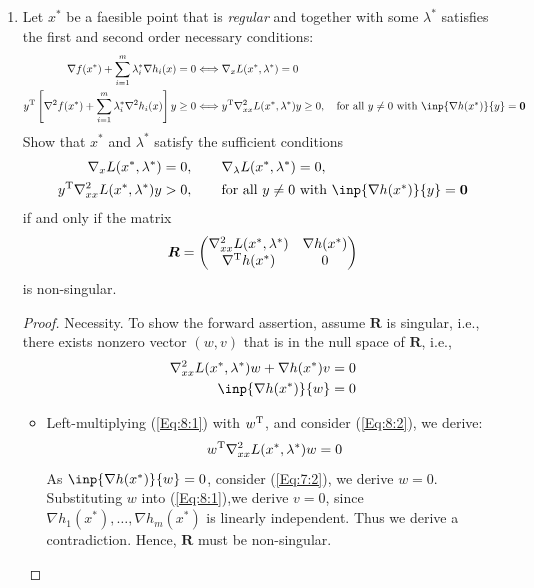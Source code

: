 \begin{enumerate}
\item
Let $x^*$ be a faesible point that is \emph{regular} and together with some $\lambda^*$ satisfies the first and second order necessary conditions:
\begin{subequations}
\begin{align}
\nabla f(x^*)+\sum_{i=1}^m\lambda_i^*\nabla h_i(x)&=0\Longleftrightarrow
\nabla_x L(x^*,\lambda^*)=0
\\
y\trans\left[\nabla^2 f(x^*)+\sum_{i=1}^m\lambda_i^*\nabla^2 h_i(x)\right]y&\ge0
\Longleftrightarrow y\trans
\nabla^2_{xx} L(x^*,\lambda^*)y\ge0,
\quad
\mbox{for all $y\ne0$ with $\inp{\nabla h(x^*)}{y}=\bm0$}
\label{Eq:6:b}
\end{align}
\end{subequations}
Show that $x^*$ and $\lambda^*$ satisfy the sufficient conditions 
\begin{subequations}
\begin{align}
\nabla_xL(x^*,\lambda^*)&=0,\qquad
\nabla_\lambda L(x^*,\lambda^*)=0,\\
y\trans\nabla^2_{xx}L(x^*,\lambda^*)y&>0,\qquad
\mbox{for all $y\ne0$ with $\inp{\nabla h(x^*)}{y}=\bm0$}\label{Eq:7:2}
\end{align}
\end{subequations}
if and only if the matrix
\[\bm R=
\begin{pmatrix}
\nabla_{xx}^2L(x^*,\lambda^*)&\nabla h(x^*)\\
\nabla^{\mathrm T} h(x^*)&0
\end{pmatrix}
\]
is non-singular.
\begin{proof}
Necessity. To show the forward assertion, assume $\bm R$ is singular, i.e., there exists nonzero vector $(w,v)$ that is in the null space of $\bm R$, i.e.,
\begin{subequations}
\begin{align}
\nabla_{xx}^2L(x^*,\lambda^*)w+\nabla h(x^*)v&=0\label{Eq:8:1}\\
\inp{\nabla h(x^*)}{w}&=0\label{Eq:8:2}
\end{align}
\end{subequations}
\begin{itemize}
\item
Left-multiplying (\ref{Eq:8:1}) with $w^{\mathrm T}$, and consider (\ref{Eq:8:2}), we derive:
\begin{equation}
w^{\mathrm T}\nabla_{xx}^2L(x^*,\lambda^*)w=0
\end{equation}
As $\inp{\nabla h(x^*)}{w}=0$, consider (\ref{Eq:7:2}), we derive $w=0$. Substituting $w$ into (\ref{Eq:8:1}),we derive $v=0$, since $\nabla h_1(x^*),\dots,\nabla h_m(x^*)$ is linearly independent. Thus we derive a contradiction. Hence, $\bm R$ must be non-singular.

\end{itemize}
\end{proof}
\end{enumerate}
